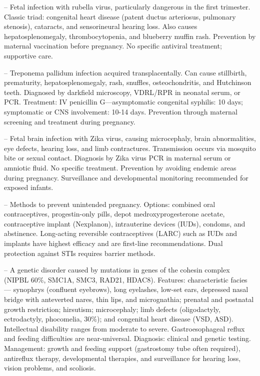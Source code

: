 -- Fetal infection with rubella virus, particularly dangerous in the first trimester. Classic triad: congenital heart disease (patent ductus arteriosus, pulmonary stenosis), cataracts, and sensorineural hearing loss. Also causes hepatosplenomegaly, thrombocytopenia, and blueberry muffin rash. Prevention by maternal vaccination before pregnancy. No specific antiviral treatment; supportive care.

-- Treponema pallidum infection acquired transplacentally. Can cause stillbirth, prematurity, hepatosplenomegaly, rash, snuffles, osteochondritis, and Hutchinson teeth. Diagnosed by darkfield microscopy, VDRL/RPR in neonatal serum, or PCR. Treatment: IV penicillin G---asymptomatic congenital syphilis: 10 days; symptomatic or CNS involvement: 10-14 days. Prevention through maternal screening and treatment during pregnancy.

-- Fetal brain infection with Zika virus, causing microcephaly, brain abnormalities, eye defects, hearing loss, and limb contractures. Transmission occurs via mosquito bite or sexual contact. Diagnosis by Zika virus PCR in maternal serum or amniotic fluid. No specific treatment. Prevention by avoiding endemic areas during pregnancy. Surveillance and developmental monitoring recommended for exposed infants.

-- Methods to prevent unintended pregnancy. Options: combined oral contraceptives, progestin-only pills, depot medroxyprogesterone acetate, contraceptive implant (Nexplanon), intrauterine devices (IUDs), condoms, and abstinence. Long-acting reversible contraceptives (LARC) such as IUDs and implants have highest efficacy and are first-line recommendations. Dual protection against STIs requires barrier methods.

-- A genetic disorder caused by mutations in genes of the cohesin complex (NIPBL 60\%, SMC1A, SMC3, RAD21, HDAC8). Features: characteristic facies — synophrys (confluent eyebrows), long eyelashes, low-set ears, depressed nasal bridge with anteverted nares, thin lips, and micrognathia; prenatal and postnatal growth restriction; hirsutism; microcephaly; limb defects (oligodactyly, ectrodactyly, phocomelia, 30\%); and congenital heart disease (VSD, ASD). Intellectual disability ranges from moderate to severe. Gastroesophageal reflux and feeding difficulties are near-universal. Diagnosis: clinical and genetic testing. Management: growth and feeding support (gastrostomy tube often required), antireflux therapy, developmental therapies, and surveillance for hearing loss, vision problems, and scoliosis.

